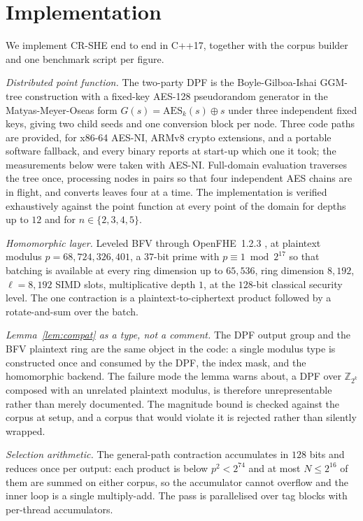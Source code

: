 \documentclass[a4paper,fleqn]{cas-dc}
\begin{document}
\section{Implementation}
\label{sec:impl}

We implement CR-SHE end to end in C++17, together with the corpus builder
and one benchmark script per figure.

\emph{Distributed point function.} The two-party DPF is the
Boyle-Gilboa-Ishai GGM-tree construction with a fixed-key AES-128
pseudorandom generator in the Matyas-Meyer-Oseas form
$G(s)=\mathrm{AES}_k(s)\oplus s$ under three independent fixed keys, giving
two child seeds and one conversion block per node. Three code paths are
provided, for x86-64 AES-NI, ARMv8 crypto extensions, and a portable
software fallback, and every binary reports at start-up which one it took; the
measurements below were taken with AES-NI. Full-domain evaluation traverses
the tree once, processing nodes in pairs so that four independent AES chains
are in flight, and converts leaves four at a time. The implementation is
verified exhaustively against the point function at every point of the domain
for depths up to $12$ and for $n\in\{2,3,4,5\}$.

\emph{Homomorphic layer.} Leveled BFV through OpenFHE~1.2.3
\citep{openfhe}, at plaintext modulus $p=68{,}724{,}326{,}401$, a $37$-bit
prime with $p\equiv 1 \bmod 2^{17}$ so that batching is available at every
ring dimension up to $65{,}536$, ring dimension $8{,}192$, $\ell=8{,}192$ SIMD
slots, multiplicative depth $1$, at the $128$-bit classical security level.
The one contraction is a plaintext-to-ciphertext product followed by a
rotate-and-sum over the batch.

\emph{Lemma~\ref{lem:compat} as a type, not a comment.} The DPF output group
and the BFV plaintext ring are the same object in the code: a single modulus
type is constructed once and consumed by the DPF, the index mask, and the
homomorphic backend. The failure mode the lemma warns about, a DPF over
$\mathbb{Z}_{2^k}$ composed with an unrelated plaintext modulus, is therefore
unrepresentable rather than merely documented. The magnitude bound is checked
against the corpus at setup, and a corpus that would violate it is rejected
rather than silently wrapped.

\emph{Selection arithmetic.} The general-path contraction accumulates in $128$
bits and reduces once per output: each product is below $p^2<2^{74}$ and at
most $N\le 2^{16}$ of them are summed on either corpus, so the accumulator
cannot overflow and the inner loop is a single multiply-add. The pass is
parallelised over tag blocks with per-thread accumulators.
\end{document}
